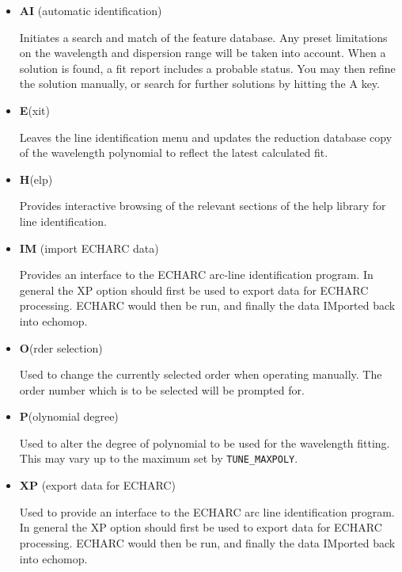 \documentclass[11pt,twoside]{article}
\newcommand{\htmlref}[2]{#1}
\newcommand{\xref}[3]{#1}
\newcommand{\sunspec}[2]{#1}
\renewcommand{\sunspec}[2]{#2}
\newcommand{\myindex}[1]{\index{#1}}
\renewcommand{\myindex}[1]{}
\newcommand{\cmdname}{\begingroup \catcode`\_=12 \realcmdname}
\newcommand{\realcmdname}[1]{\endgroup\texttt{#1}}
\begin{document}
\begin{itemize}

\item {\sunspec{\Large\tt}{\bf} AI} (automatic identification)

      Initiates a search and
      match of the feature database. Any preset limitations on the
      wavelength and dispersion range will be taken into account. When a
      solution is found, a fit report includes a probable status.
      You may then refine the solution manually, or search for
      further solutions by hitting the A key.


\item {\sunspec{\Large\tt}{\bf} E}(xit)

      Leaves the line identification menu and
      updates the reduction database copy of the wavelength polynomial to
      reflect the latest calculated fit.

\item {\sunspec{\Large\tt}{\bf} H}(elp)

      Provides interactive browsing of the relevant
      sections of the help library for line identification.

\item {\sunspec{\Large\tt}{\bf} IM} (import \xref{ECHARC}{sun86}{ECHARC} data)
\myindex{ECHARC data exchange@\protect\cmdname{ECHARC} data exchange}
      Provides an interface
      to the ECHARC arc-line identification program. In general the XP
      option should first be used to export data for ECHARC processing.
      ECHARC would then be run, and finally the data IMported back into
      {\sc echomop}.

\item {\sunspec{\Large\tt}{\bf} O}(rder selection)

      Used to change the currently
      selected order when operating manually. The order number which is to
      be selected will be prompted for.

\item {\sunspec{\Large\tt}{\bf} P}(olynomial degree)

      Used to alter the degree of
      polynomial to be used for the wavelength fitting. This may vary up to
      the maximum set by \htmlref{{\tt TUNE\_MAXPOLY}}{par_TUNE_MAXPOLY}\@.

\item {\sunspec{\Large\tt}{\bf} XP} (export data for ECHARC)

      Used to provide an
      interface to the ECHARC arc line identification program. In general
      the XP option should first be used to export data for ECHARC
      processing. ECHARC would then be run, and finally the data IMported
      back into {\sc echomop}.


\end{itemize}
\end{document}
